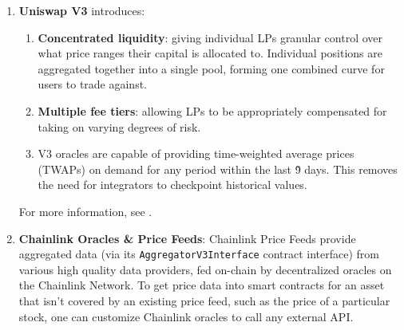 \begin{enumerate}
\item\textbf{Uniswap V3} introduces:
	\begin{enumerate}
	\item\textbf{Concentrated liquidity}: giving individual LPs granular control over what price ranges their capital is allocated to. Individual positions are aggregated together into a single pool, forming one combined curve for users to trade against.
	\item\textbf{Multiple fee tiers}: allowing LPs to be appropriately compensated for taking on varying degrees of risk.
	\item V3 oracles are capable of providing time-weighted average prices (TWAPs) on demand for any period within the last \~9 days. This removes the need for integrators to checkpoint historical values.
	\end{enumerate}
For more information, see \cite{uniswapv3_blog}.

\item\textbf{Chainlink Oracles \& Price Feeds}: Chainlink Price Feeds provide aggregated data (via its \verb|AggregatorV3Interface| contract interface) from various high quality data providers, fed on-chain by decentralized oracles on the Chainlink Network. To get price data into smart contracts for an asset that isn’t covered by an existing price feed, such as the price of a particular stock, one can customize Chainlink oracles to call any external API.

\end{enumerate}

